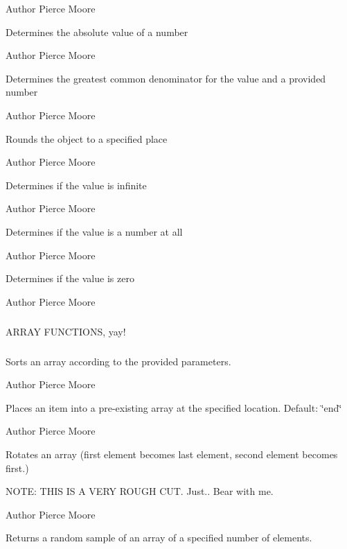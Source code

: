 \begin{DoxyAuthor}{Author}
Pierce Moore
\end{DoxyAuthor}
Determines the absolute value of a number

\begin{DoxyAuthor}{Author}
Pierce Moore
\end{DoxyAuthor}
Determines the greatest common denominator for the value and a provided number

\begin{DoxyAuthor}{Author}
Pierce Moore
\end{DoxyAuthor}
Rounds the object to a specified place

\begin{DoxyAuthor}{Author}
Pierce Moore
\end{DoxyAuthor}
Determines if the value is infinite

\begin{DoxyAuthor}{Author}
Pierce Moore
\end{DoxyAuthor}
Determines if the value is a number at all

\begin{DoxyAuthor}{Author}
Pierce Moore
\end{DoxyAuthor}
Determines if the value is zero

\begin{DoxyAuthor}{Author}
Pierce Moore
\end{DoxyAuthor}
\subparagraph*{}

\begin{DoxyVerb}                   ARRAY FUNCTIONS, yay!\end{DoxyVerb}
 \subparagraph*{}

Sorts an array according to the provided parameters.

\begin{DoxyAuthor}{Author}
Pierce Moore
\end{DoxyAuthor}
Places an item into a pre-\/existing array at the specified location. Default\-: \char`\"{}end\char`\"{}

\begin{DoxyAuthor}{Author}
Pierce Moore
\end{DoxyAuthor}
Rotates an array (first element becomes last element, second element becomes first.)

N\-O\-T\-E\-: T\-H\-I\-S I\-S A V\-E\-R\-Y R\-O\-U\-G\-H C\-U\-T. Just.. Bear with me.

\begin{DoxyAuthor}{Author}
Pierce Moore
\end{DoxyAuthor}
Returns a random sample of an array of a specified number of elements.

